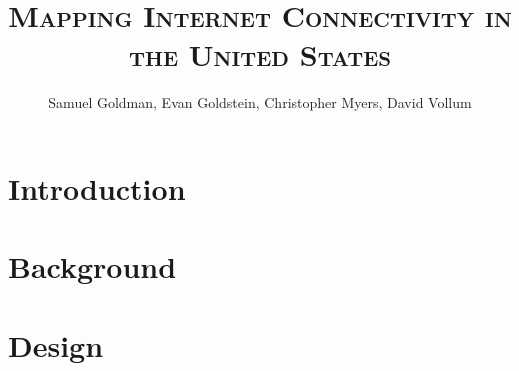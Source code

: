 \documentclass[12pt,oneside,letterpaper,article]{memoir}
\title{\scshape Mapping Internet Connectivity in the United States}
\author{Samuel Goldman, Evan Goldstein, Christopher Myers, David Vollum}
\begin{document}
    
    \maketitle
    \newpage
    
    
    \newpage
    
    \tableofcontents\newpage
    \listoffigures
    \listoftables
    \newpage
    
    \pagestyle{headings}
    
    
    
    \chapter{Introduction}\label{sec:introduction}
    
    
    \newpage
    \chapter{Background}\label{sec:background}
    
    
    
    
    
    
    
    
    
    
    \newpage
    \chapter{Design}\label{sec:design}
    
    
    
    
    
    
    
\end{document}
